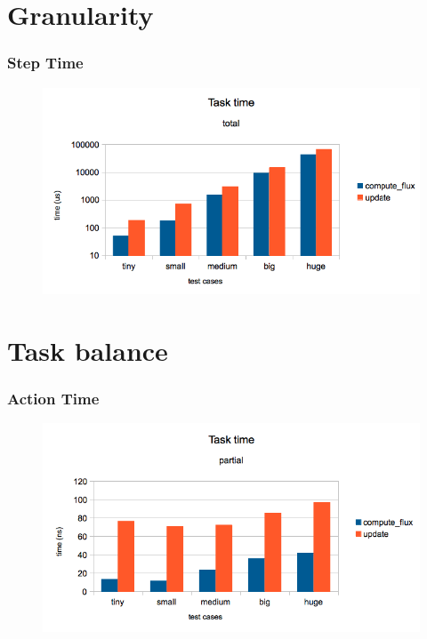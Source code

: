 \documentclass{beamer}
\begin{document}
\section{Granularity}
\begin{frame}
	\frametitle{Step Time}
	\begin{figure}
		\begin{center}
			\includegraphics[width=\textwidth]{images/slides.march/tasktime_total.png}
		\end{center}
	\end{figure}
\end{frame}

\section{Task balance}
\begin{frame}
	\frametitle{Action Time}
	\begin{figure}
		\begin{center}
			\includegraphics[width=\textwidth]{images/slides.march/tasktime_partial.png}
		\end{center}
	\end{figure}
\end{frame}
\end{document}
